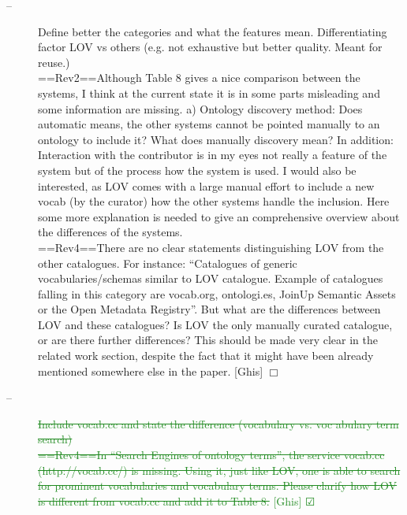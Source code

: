 \documentclass[a4paper,notitlepage]{article}
\newcommand\todo[2]{\item[--] #1 \hfill[#2] $\Box$}%
\newcommand\done[2]{ \item[--]\textcolor{ForestGreen}{\st{#1}} \hfill\textcolor{ForestGreen}{[#2] $\CheckedBox$}}%
\begin{document}
\begin{description}
 \todo{Define better the categories and what the features mean. Differentiating factor LOV vs others (e.g. not exhaustive but better quality. Meant for reuse.) \\
==Rev2==Although Table 8 gives a nice comparison between the systems, I think at the current state it is in some parts misleading and some information are missing. a) Ontology discovery method: Does automatic means, the other systems cannot be pointed manually to an ontology to include it? What does manually discovery mean? In addition: Interaction with the contributor is in my eyes not really a feature of the system but of the process how the system is used. I would also be interested, as LOV comes with a large manual effort to include a new vocab (by the curator) how the other systems handle the inclusion. Here some more explanation is needed to give an comprehensive overview about the differences of the systems.\\
==Rev4==There are no clear statements distinguishing LOV from the other catalogues. For instance: “Catalogues of generic vocabularies/schemas similar to LOV catalogue. Example of catalogues falling in this category are vocab.org, ontologi.es, JoinUp Semantic Assets or the Open Metadata Registry”. But what are the differences between LOV and these catalogues? Is LOV the only manually curated catalogue, or are there further differences? This should be made very clear in the related work section, despite the fact that it might have been already mentioned somewhere else in the paper.}{Ghis}

 \done{Include vocab.cc and state the difference (vocabulary vs. voc abulary term search) \\
==Rev4==In “Search Engines of ontology terms”, the service vocab.cc (http://vocab.cc/) is missing. Using it, just like LOV, one is able to search for prominent vocabularies and vocabulary terms. Please clarify how LOV is different from vocab.cc and add it to Table 8.}{Ghis}


\end{description}
\end{document}
